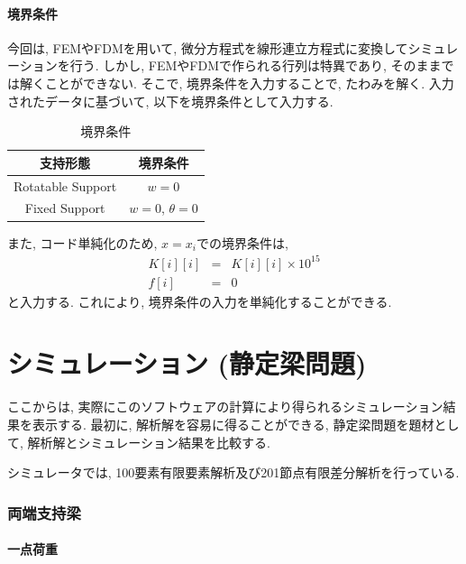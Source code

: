 \documentclass{jsarticle}
\begin{document}
\subsection{境界条件}
今回は, FEMやFDMを用いて, 微分方程式を線形連立方程式に変換してシミュレーションを行う. しかし, FEMやFDMで作られる行列は特異であり, そのままでは解くことができない. そこで, 境界条件を入力することで, たわみを解く. 入力されたデータに基づいて, 以下を境界条件として入力する.
\begin{table}[H]
\begin{center}
\caption{境界条件}
\begin{tabular}{|c|c|}
\hline
支持形態 & 境界条件 \\
\hline
Rotatable Support & $w = 0$ \\
\hline
Fixed Support & $w = 0$, $\theta = 0$ \\
\hline
\end{tabular}
\end{center}
\end{table}

また, コード単純化のため, $x=x_i$での境界条件は,
\begin{eqnarray*}
K[i][i] &=& K[i][i]\times10^{15} \\
f[i] &=& 0
\end{eqnarray*}
と入力する. これにより, 境界条件の入力を単純化することができる.

\newpage

\part{シミュレーション (静定梁問題)}
ここからは, 実際にこのソフトウェアの計算により得られるシミュレーション結果を表示する. 最初に, 解析解を容易に得ることができる, 静定梁問題を題材として, 解析解とシミュレーション結果を比較する.

シミュレータでは, 100要素有限要素解析及び201節点有限差分解析を行っている.

\newpage

\section{両端支持梁}
\subsection{一点荷重}
\end{document}
